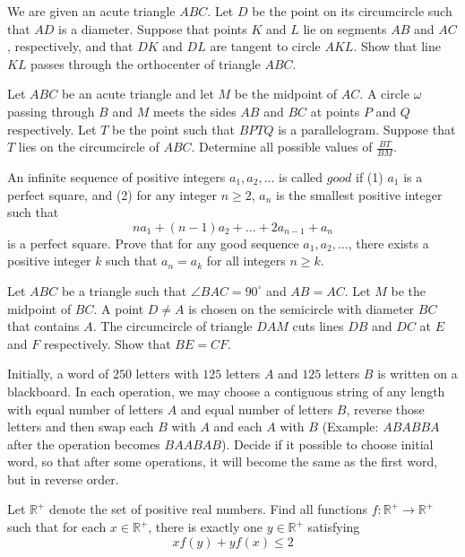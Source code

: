 \documentclass[11pt]{scrartcl}
\begin{document}
\begin{problem}[6412565047152896593]
	We are given an acute triangle $ABC$. Let $D$ be the point on its circumcircle such that $AD$ is a diameter. Suppose that points $K$ and $L$ lie on segments $AB$ and $AC$, respectively, and that $DK$ and $DL$ are tangent to circle $AKL$.
Show that line $KL$ passes through the orthocenter of triangle $ABC$.
\end{problem}
\begin{problem}[6438524243840428787]
	Let $ABC$ be an acute triangle and let $M$ be the midpoint of $AC$. A circle $\omega$ passing through $B$ and $M$ meets the sides $AB$ and $BC$ at points $P$ and $Q$ respectively. Let $T$ be the point such that $BPTQ$ is a parallelogram. Suppose that $T$ lies on the circumcircle of $ABC$. Determine all possible values of $\frac{BT}{BM}$.
\end{problem}
\begin{problem}[6444187106925350071]
	An infinite sequence of positive integers $a_1, a_2, \dots$ is called $good$ if
(1) $a_1$ is a perfect square, and
(2) for any integer $n \ge 2$, $a_n$ is the smallest positive integer such that$$na_1 + (n-1)a_2 + \dots + 2a_{n-1} + a_n$$is a perfect square.
Prove that for any good sequence $a_1, a_2, \dots$, there exists a positive integer $k$ such that $a_n=a_k$ for all integers $n \ge k$.
\end{problem}
\begin{problem}[6489054720541585180]
Let $ABC$ be a triangle such that $\angle BAC = 90^{\circ}$ and $AB = AC$. Let $M$ be the midpoint of $BC$. A point $D \neq A$ is chosen on the semicircle with diameter $BC$ that contains $A$. The circumcircle of triangle $DAM$ cuts lines $DB$ and $DC$ at $E$ and $F$ respectively. Show that $BE = CF$.
\end{problem}
\begin{problem}[6497483389877629432]
Initially, a word of $250$ letters with $125$ letters $A$ and $125$ letters $B$ is written on a blackboard. In each operation, we may choose a contiguous string of any length with equal number of letters $A$ and equal number of letters $B$, reverse those letters and then swap each $B$ with $A$ and each $A$ with $B$ (Example: $ABABBA$ after the operation becomes $BAABAB$). Decide if it possible to choose initial word, so that after some operations, it will become the same as the first word, but in reverse order.
\end{problem}
\begin{problem}[6558910862034852540]
Let $\mathbb{R}^+$ denote the set of positive real numbers. Find all functions $f: \mathbb{R}^+ \to \mathbb{R}^+$ such that for each $x \in \mathbb{R}^+$, there is exactly one $y \in \mathbb{R}^+$ satisfying$$xf(y)+yf(x) \leq 2$$
\end{problem}
\end{document}
